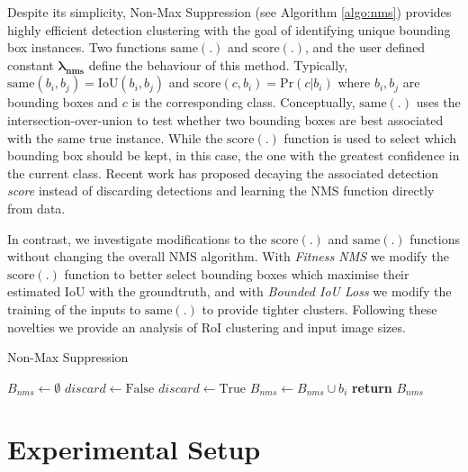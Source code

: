 \documentclass[10pt,twocolumn,letterpaper]{article}
\begin{document}
Despite its simplicity, Non-Max Suppression (see Algorithm \ref{algo:nms}) provides highly efficient detection clustering with the goal of identifying unique bounding box instances. Two functions $\mathrm{same}(.)$ and $\mathrm{score}(.)$, and the user defined constant $\bm{\lambda_{nms}}$ define the behaviour of this method. Typically,  $\mathrm{same}(b_i,b_j) = \mathrm{IoU}(b_i,b_j)$ and $\mathrm{score}(c,b_i) = \mathrm{Pr}(c|b_i)$ where $b_i,b_j$ are bounding boxes and $c$ is the corresponding class. Conceptually, $\mathrm{same}(.)$ uses the intersection-over-union to test whether two bounding boxes are best associated with the same true instance. While the $\mathrm{score}(.)$ function is used to select which bounding box should be kept, in this case, the one with the greatest confidence in the current class. Recent work has proposed decaying the associated detection \textit{score} instead of discarding detections\cite{soft-nms} and learning the NMS function directly from data\cite{learn-nms}\cite{learn-nms2}. 

In contrast, we investigate modifications to the $\mathrm{score}(.)$ and $\mathrm{same}(.)$ functions without changing the overall NMS algorithm. With \textit{Fitness NMS} we modify the $\mathrm{score}(.)$ function to better select bounding boxes which maximise their estimated IoU with the groundtruth, and with \textit{Bounded IoU Loss} we modify the training of the inputs to $\mathrm{same}(.)$ to provide tighter clusters. Following these novelties we provide an analysis of RoI clustering and input image sizes. 

\begin{algorithm}[tb]
\caption{Non-Max Suppression}\label{algo:nms}
\begin{algorithmic}[1]
\State $B_{nms} \gets \emptyset$
\State $discard \gets \mathrm{False}$
\State $discard \gets \mathrm{True}$
\EndIf
\EndIf
\EndFor
{} 
\State $B_{nms} \gets B_{nms} \cup b_i$
\EndIf
\EndFor
\State \textbf{return} $B_{nms}$
\EndProcedure
\end{algorithmic}
\end{algorithm}

\section{Experimental Setup}
\end{document}
